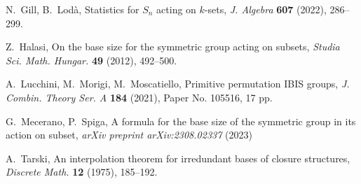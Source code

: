 \documentclass{amsart}
\begin{document}
	N.~Gill, B.~Lod\`{a}, Statistics for $S_n$ acting on $k$-sets, \textit{J. Algebra} \textbf{607} (2022), 286--299.
	
	Z.~Halasi, On the base size for the symmetric group acting on subsets, \textit{Studia Sci. Math. Hungar.} \textbf{49} (2012), 492--500.
	
	A.~Lucchini, M.~Morigi, M.~Moscatiello, Primitive permutation IBIS groups, \textit{J. Combin. Theory Ser. A} \textbf{184} (2021), Paper No. 105516, 17 pp. 
	
	G.~Mecerano, P.~Spiga, A formula for the base size of the symmetric group in its action on subset, \textit{ arXiv preprint arXiv:2308.02337} (2023)
	
	A.~Tarski, An interpolation theorem for irredundant bases of closure structures, \textit{Discrete Math.} \textbf{12} (1975), 185--192.
	
	
	
	
\end{document}
